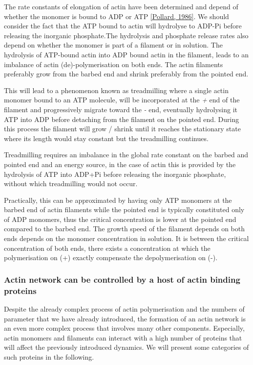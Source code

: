 \documentclass[A4paperpaper,11pt,english]{sphinxmanual}
\begin{document}
The rate constants of elongation of actin have been determined and depend of
whether the monomer is bound to ADP or ATP {\hyperref[parts/part1:pollard1986]{{[}Pollard,  1986{]}}}. We should
consider the fact that the  ATP bound to actin will hydrolyse to ADP-Pi before releasing
the inorganic phosphate.The hydrolysis and phosphate release rates also depend on whether the
monomer is part of a filament or in solution. The hydrolysis of ATP-bound
actin into ADP bound actin in the filament,  leads to an imbalance of actin
(de)-polymerisation on both ends. The actin filaments preferably
grow from the barbed end and shrink preferably from the pointed end.

This will lead to a phenomenon known as treadmilling where a single actin
monomer bound to an ATP molecule, will be incorporated at the \emph{+} end of the
filament and progressively migrate toward the \emph{-} end, eventually hydrolysing it
ATP into ADP before detaching from the filament on the pointed end. During this
process the filament will grow / shrink until it reaches the stationary state
where its length would stay constant but the treadmilling continues.

Treadmilling requires an imbalance in the global rate constant on the barbed and
pointed end and an energy source, in the case of actin this is provided by the
hydrolysis of ATP into ADP+Pi before releasing the inorganic phosphate, without
which treadmilling would not occur.

Practically, this can be approximated by having only ATP monomers at the barbed
end of actin filaments while the pointed end is typically constituted only of
ADP monomers, thus the critical concentration is lower at the  pointed end
compared to the barbed end. The growth speed of the filament depends on both
ends depends on the monomer concentration in solution. It is between the
critical concentration of both ends, there exists a concentration at which the
polymerisation on (+) exactly compensate the depolymerisation on (-).


\subsubsection{Actin network can be controlled by a host of actin binding proteins}
\label{parts/part1:actin-network-can-be-controlled-by-a-host-of-actin-binding-proteins}
Despite the already complex process of actin polymerisation and the
numbers of parameter that we have already introduced, the formation of an actin
network is an even more complex process that involves many other components.
Especially, actin monomers and filaments can interact with a high number of
proteins that will affect the previously introduced dynamics.  We will present
some categories of such proteins in the following.
\end{document}

